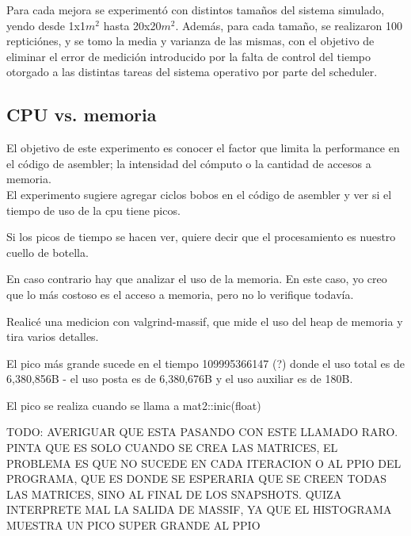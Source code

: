 Para cada mejora se experimentó con distintos tamaños del sistema simulado, yendo desde 1x1$m^2$ hasta 20x20$m^2$. Además, para cada tamaño, se realizaron 100 repticiónes, y se tomo la media y varianza de las mismas, con el objetivo de eliminar el error de medición introducido por la falta de control del tiempo otorgado a las distintas tareas del sistema operativo por parte del scheduler.

\subsection{CPU vs. memoria}

El objetivo de este experimento es conocer el factor que limita la performance en el código de asembler; la intensidad del cómputo o la cantidad de accesos a memoria.\\
El experimento sugiere agregar ciclos bobos en el código de asembler y ver si el tiempo de uso de la cpu tiene picos.







Si los picos de tiempo se hacen ver, quiere decir que el procesamiento es nuestro cuello de botella.

En caso contrario hay que analizar el uso de la memoria.
En este caso, yo creo que lo más costoso es el acceso a memoria, pero no lo verifique todavía.

Realicé una medicion con valgrind-massif, que mide el uso del heap de memoria y tira varios detalles.

El pico más grande sucede en el tiempo 109995366147 (?) donde el uso total es de 6,380,856B - el uso posta es de 6,380,676B y el uso auxiliar es de 180B.

El pico se realiza cuando se llama a mat2::inic(float)

TODO: AVERIGUAR QUE ESTA PASANDO CON ESTE LLAMADO RARO. PINTA QUE ES SOLO CUANDO SE CREA LAS MATRICES, EL PROBLEMA ES QUE NO SUCEDE EN CADA ITERACION O AL PPIO DEL PROGRAMA, QUE ES DONDE SE ESPERARIA QUE SE CREEN TODAS LAS MATRICES, SINO AL FINAL DE LOS SNAPSHOTS. QUIZA INTERPRETE MAL LA SALIDA DE MASSIF, YA QUE EL HISTOGRAMA MUESTRA UN PICO SUPER GRANDE AL PPIO
